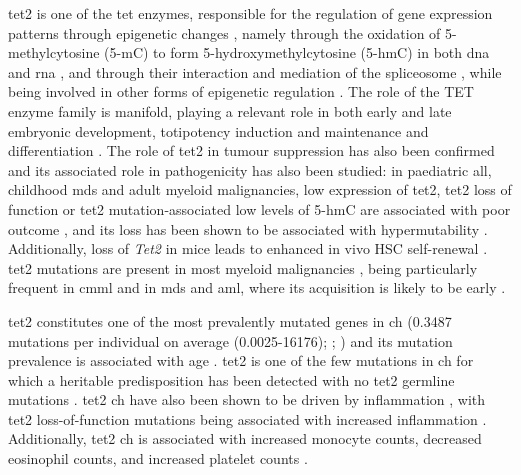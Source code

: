 \Ac{tet2} is one of the \ac{tet} enzymes, responsible for the regulation of gene expression patterns through epigenetic changes \cite{Rasmussen2016-rt}, namely through the oxidation of 5-methylcytosine (5-mC) to form 5-hydroxymethylcytosine (5-hmC) in both \ac{dna} \cite{Tahiliani2009-gj,Ito2010-el,Guallar2018-eg} and \ac{rna} \cite{He2016-nm,Fu2014-kw}, and through their interaction and mediation of the spliceosome \cite{Rappsilber2002-ll,Tan2009-vw}, while being involved in other forms of epigenetic regulation \cite{Yang2020-yb}. The role of the TET enzyme family is manifold, playing a relevant role in both early and late embryonic development, totipotency induction and maintenance and differentiation \cite{Yang2020-yb}. The role of \ac{tet2} in tumour suppression has also been confirmed \cite{Wang2015-ih} and its associated role in pathogenicity has also been studied: in paediatric \ac{all}, childhood \ac{mds} and adult myeloid malignancies, low expression of \ac{tet2}, \ac{tet2} loss of function or \ac{tet2} mutation-associated low levels of 5-hmC are associated with poor outcome \cite{Zhang2019-on,Coutinho2015-pb,Liu2013-rf}, and its loss has been shown to be associated with hypermutability \cite{Pan2017-ic}. Additionally, loss of \textit{Tet2} in mice leads to enhanced in vivo HSC self-renewal \cite{Moran-Crusio2011-rm}. \ac{tet2} mutations are present in most myeloid malignancies \cite{Delhommeau2009-xp,Abdel-Wahab2009-ir}, being particularly frequent in \ac{cmml} \cite{Abdel-Wahab2009-ir} and in \ac{mds} and \ac{aml}, where its acquisition is likely to be early \cite{Langemeijer2009-ll,Welch2012-uq,Shlush2014-di}.

\Ac{tet2} constitutes one of the most prevalently mutated genes in \ac{ch} \cite{Jaiswal2014-rl,Genovese2014-eu,Zink2017-zi,Bolton2020-ct,Coombs2017-ph,Acuna-Hidalgo2017-ng,Desai2018-pj,Young2016-du,Young2019-rz} (0.3487 mutations per individual on average (0.0025-16176); ; ) and its mutation prevalence is associated with age \cite{Xie2014-np,Buscarlet2017-vh}. \Ac{tet2} is one of the few mutations in \ac{ch} for which a heritable predisposition has been detected with no \ac{tet2} germline mutations \cite{Buscarlet2017-vh,Bick2020-gk}. \ac{tet2} \ac{ch} have also been shown to be driven by inflammation \cite{Zhang2019-wb,Cai2018-yi}, with \ac{tet2} loss-of-function mutations being associated with increased inflammation \cite{Zhang2015-wy,Cai2018-yi}. Additionally, \ac{tet2} \ac{ch} is associated with increased monocyte counts, decreased eosinophil counts, and increased platelet counts \cite{Buscarlet2017-vh,Dawoud2020-af}. 

